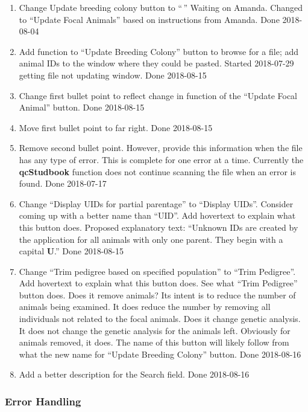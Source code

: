 \documentclass[
]{article}
\providecommand{\tightlist}{%
  \setlength{\itemsep}{0pt}\setlength{\parskip}{0pt}}
\begin{document}
\begin{enumerate}
\def\labelenumi{\arabic{enumi}.}
\tightlist
\item
  Change Update breeding colony button to ``\,'' Waiting on Amanda.
  Changed to ``Update Focal Animals'' based on instructions from Amanda.
  Done 2018-08-04
\item
  Add function to ``Update Breeding Colony'' button to browse for a
  file; add animal IDs to the window where they could be pasted. Started
  2018-07-29 getting file not updating window. Done 2018-08-15
\item
  Change first bullet point to reflect change in function of the
  ``Update Focal Animal'' button. Done 2018-08-15
\item
  Move first bullet point to far right. Done 2018-08-15
\item
  Remove second bullet point. However, provide this information when the
  file has any type of error. This is complete for one error at a time.
  Currently the \textbf{qcStudbook} function does not continue scanning
  the file when an error is found. Done 2018-07-17
\item
  Change ``Display UIDs for partial parentage'' to ``Display UIDs''.
  Consider coming up with a better name than ``UID''. Add hovertext to
  explain what this button does. Proposed explanatory text: ``Unknown
  IDs are created by the application for all animals with only one
  parent. They begin with a capital \textbf{U}.'' Done 2018-08-15
\item
  Change ``Trim pedigree based on specified population'' to ``Trim
  Pedigree''. Add hovertext to explain what this button does. See what
  ``Trim Pedigree'' button does. Does it remove animals? Its intent is
  to reduce the number of animals being examined. It does reduce the
  number by removing all individuals not related to the focal animals.
  Does it change genetic analysis. It does not change the genetic
  analysis for the animals left. Obviously for animals removed, it does.
  The name of this button will likely follow from what the new name for
  ``Update Breeding Colony'' button. Done 2018-08-16
\item
  Add a better description for the Search field. Done 2018-08-16
\end{enumerate}

\hypertarget{error-handling}{%
\subsubsection{Error Handling}\label{error-handling}}
\end{document}
